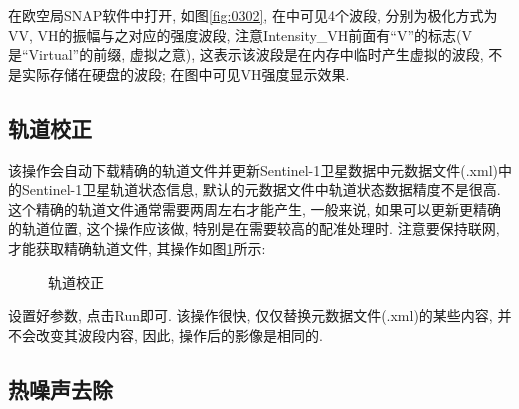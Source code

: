 在欧空局SNAP软件中打开, 如图\ref{fig:0302}, 在中可见4个波段, 分别为极化方式为VV, VH的振幅与之对应的强度波段, 注意Intensity\_VH前面有``V''的标志(V是``Virtual''的前缀, 虚拟之意), 这表示该波段是在内存中临时产生虚拟的波段, 不是实际存储在硬盘的波段; 在图中可见VH强度显示效果.

\subsection{轨道校正}
该操作会自动下载精确的轨道文件并更新Sentinel-1卫星数据中元数据文件(.xml)中的Sent\-inel-1卫星轨道状态信息, 默认的元数据文件中轨道状态数据精度不是很高. 这个精确的轨道文件通常需要两周左右才能产生, 一般来说, 如果可以更新更精确的轨道位置, 这个操作应该做, 特别是在需要较高的配准处理时. 注意要保持联网, 才能获取精确轨道文件, 其操作如图\ref{fig:0303}所示:

\begin{figure}[ht]
    \centering
    \qquad
    \caption{轨道校正}
    \label{fig:0303}
\end{figure}

设置好参数, 点击Run即可. 该操作很快, 仅仅替换元数据文件(.xml)的某些内容, 并不会改变其波段内容, 因此, 操作后的影像是相同的.

\subsection{热噪声去除}

